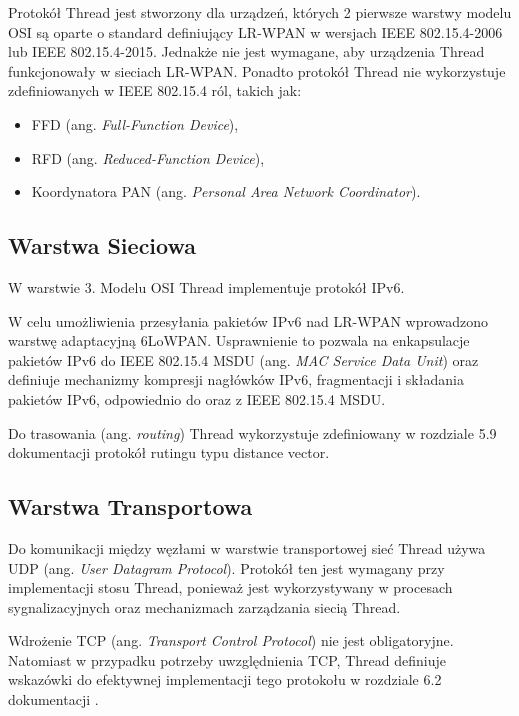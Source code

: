         Protokół Thread jest stworzony dla urządzeń, których 2 pierwsze warstwy modelu OSI są oparte o standard definiujący LR-WPAN w wersjach IEEE 802.15.4-2006 lub IEEE 802.15.4-2015. Jednakże nie jest wymagane, aby urządzenia Thread funkcjonowały w sieciach LR-WPAN. Ponadto protokół Thread nie wykorzystuje zdefiniowanych w IEEE 802.15.4 ról, takich jak:
        \begin{itemize}
            \item FFD (ang. \textit{Full-Function Device}),
            \item RFD (ang. \textit{Reduced-Function Device}),
            \item Koordynatora PAN (ang. \textit{Personal Area Network Coordinator}).
        \end{itemize}

    \subsection{Warstwa Sieciowa}

        W warstwie 3. Modelu OSI Thread implementuje protokół IPv6.
        
        W celu umożliwienia przesyłania pakietów IPv6 nad LR-WPAN wprowadzono warstwę adaptacyjną 6LoWPAN. Usprawnienie to pozwala na enkapsulacje pakietów IPv6 do IEEE 802.15.4 MSDU (ang. \textit{MAC Service Data Unit}) oraz definiuje mechanizmy kompresji nagłówków IPv6, fragmentacji i składania pakietów IPv6, odpowiednio do oraz z IEEE 802.15.4 MSDU.
        
        Do trasowania (ang. \textit{routing}) Thread wykorzystuje zdefiniowany w rozdziale 5.9 dokumentacji \cite{thread-1.3.0} protokół rutingu typu distance vector.

    \subsection{Warstwa Transportowa}
    
        Do komunikacji między węzłami w warstwie transportowej sieć Thread używa UDP (ang. \textit{User Datagram Protocol}). Protokół ten jest wymagany przy implementacji stosu Thread, ponieważ jest wykorzystywany w procesach sygnalizacyjnych oraz mechanizmach zarządzania siecią Thread.
    
        Wdrożenie TCP (ang. \textit{Transport Control Protocol}) nie jest obligatoryjne. Natomiast w przypadku potrzeby uwzględnienia TCP, Thread definiuje wskazówki do efektywnej implementacji tego protokołu w rozdziale 6.2 dokumentacji \cite{thread-1.3.0}.

